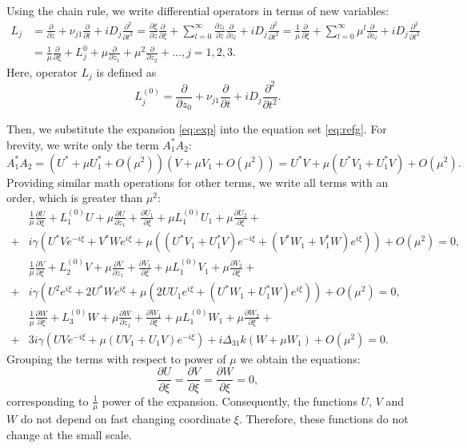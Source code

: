 \documentclass[a4paper, 12pt, onecolumn]{extarticle}
\begin{document}
Using the chain rule, we write differential operators in terms of new variables:
\begin{equation}
\label{eq:op}
\begin{aligned}
L_j&=\frac{\partial}{\partial z}+\nu_{j1}\frac{\partial}{\partial t}+iD_j\frac{\partial^2}{\partial t^2}=\frac{\partial \xi}{\partial z}\frac{\partial}{\partial \xi}+\sum\limits_{l=0}^{\infty}\frac{\partial z_l}{\partial z}\frac{\partial}{\partial z_l}+iD_j\frac{\partial^2}{\partial t^2}=\frac{1}{\mu}\frac{\partial}{\partial \xi}+\sum\limits_{l=0}^{\infty} \mu^l\frac{\partial}{\partial z_l}+iD_j\frac{\partial^2}{\partial t^2}\\
&=\frac{1}{\mu}\frac{\partial}{\partial \xi}+L_j^{0}+\mu\frac{\partial}{\partial z_1}+\mu^2 \frac{\partial}{\partial z_2}+...,j=1,2,3.
\end{aligned}
\end{equation}
Here, operator \(L_j\) is defined as 
\[L_j^{(0)}=\frac{\partial}{\partial z_0}+\nu_{j1}\frac{\partial}{\partial t}+ iD_j\frac{\partial^2}{\partial t^2}.\]

Then, we substitute the expansion \eqref{eq:exp} into the equation set \eqref{eq:refg}. For brevity, we write only the term \(A_1^*A_2\):
\[A_1^*A_2=\left(U^*+\mu U_1^*+O(\mu^2)\right)\left(V+\mu V_1+O(\mu^2)\right)=U^*V+\mu\left(U^*V_1+U_1^*V\right)+O(\mu^2).\]  
Providing similar math operations for other terms, we write all terms with an order, which is greater than \(\mu^2\):
\begin{equation}
\label{eq:allset}
\begin{aligned}
&\frac{1}{\mu}\frac{\partial U}{\partial \xi}+L_1^{(0)}U+\mu \frac{\partial U}{\partial z_1}+\frac{\partial U_1}{\partial\xi}+\mu L_1^{(0)}U_1+\mu\frac{\partial U_2}{\partial \xi}+\\
+&i\gamma\left(U^*Ve^{-i\xi}+V^*We^{i\xi}+\mu((U^*V_1+U_1^*V)e^{-i\xi}+(V^*W_1+V_1^*W)e^{i\xi})\right)+O(\mu^2)=0,\\
&\frac{1}{\mu}\frac{\partial V}{\partial \xi}+L_2^{(0)}V+\mu \frac{\partial V}{\partial z_1}+\frac{\partial V_1}{\partial\xi}+\mu L_1^{(0)}V_1+\mu\frac{\partial V_2}{\partial \xi}+\\
+&i\gamma\left(U^2e^{i\xi}+2U^*We^{i\xi}+\mu(2UU_1e^{i\xi}+(U^*W_1+U_1^*W)e^{i\xi})\right)+O(\mu^2)=0,\\
&\frac{1}{\mu}\frac{\partial W}{\partial \xi}+L_3^{(0)}W+\mu \frac{\partial W}{\partial z_1}+\frac{\partial W_1}{\partial\xi}+\mu L_1^{(0)}W_1+\mu\frac{\partial W_2}{\partial \xi}+\\
+&3i\gamma \left(UVe^{-i\xi}+\mu(UV_1+U_1V)e^{-i\xi}\right)+i\Delta_{31}k(W+\mu W_1)+O(\mu^2)=0.
\end{aligned}
\end{equation}
Grouping the terms with respect to power of \(\mu\) we obtain the equations:
\[\frac{\partial U}{\partial \xi}=\frac{\partial V}{\partial \xi}=\frac{\partial W}{\partial \xi}=0,\]
corresponding to \(\frac{1}{\mu}\) power of the expansion. Consequently, the functions \(U,\,V\) and \(W\) do not depend on fast changing coordinate \(\xi\). Therefore, these functions do not change at the small scale.
\end{document}

